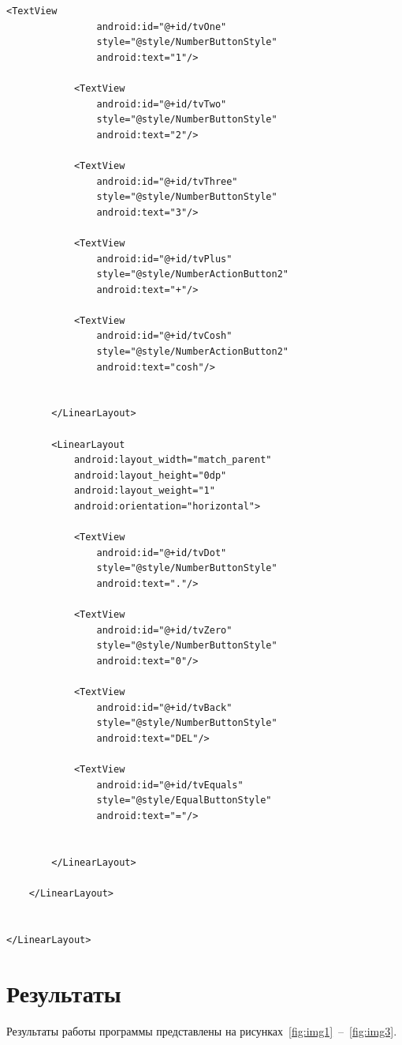 \documentclass[a4paper, 14pt]{extarticle}
\begin{document}
\begin{lstlisting}[language={},caption={Калькулятор на Kotlin},label={lst:code1}]
            <TextView
                android:id="@+id/tvOne"
                style="@style/NumberButtonStyle"
                android:text="1"/>

            <TextView
                android:id="@+id/tvTwo"
                style="@style/NumberButtonStyle"
                android:text="2"/>

            <TextView
                android:id="@+id/tvThree"
                style="@style/NumberButtonStyle"
                android:text="3"/>

            <TextView
                android:id="@+id/tvPlus"
                style="@style/NumberActionButton2"
                android:text="+"/>

            <TextView
                android:id="@+id/tvCosh"
                style="@style/NumberActionButton2"
                android:text="cosh"/>


        </LinearLayout>

        <LinearLayout
            android:layout_width="match_parent"
            android:layout_height="0dp"
            android:layout_weight="1"
            android:orientation="horizontal">

            <TextView
                android:id="@+id/tvDot"
                style="@style/NumberButtonStyle"
                android:text="."/>

            <TextView
                android:id="@+id/tvZero"
                style="@style/NumberButtonStyle"
                android:text="0"/>

            <TextView
                android:id="@+id/tvBack"
                style="@style/NumberButtonStyle"
                android:text="DEL"/>

            <TextView
                android:id="@+id/tvEquals"
                style="@style/EqualButtonStyle"
                android:text="="/>


        </LinearLayout>

    </LinearLayout>


</LinearLayout>
\end{lstlisting}

\section{Результаты}\label{Sect::res}

Результаты работы программы представлены на рисунках~\ref{fig:img1}~--~\ref{fig:img3}.
\end{document}
